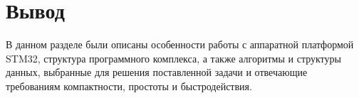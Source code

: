 \section{Вывод}
В данном разделе были описаны особенности работы с аппаратной платформой STM32, структура программного комплекса, а также алгоритмы и 
структуры данных, выбранные для решения поставленной задачи и отвечающие требованиям компактности, простоты и быстродействия.



